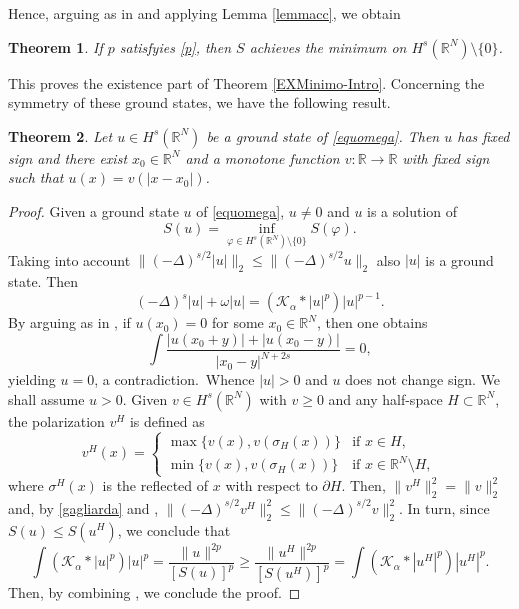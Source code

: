 \documentclass[10pt]{amsart}
\numberwithin{equation}{section}
\newtheorem{theorem}{Theorem}[section]
\begin{document}
\noindent
Hence, arguing as in  
 \cite[Proof of Proposition 2.2]{MV} 
and applying Lemma \ref{lemmacc}, we obtain
\begin{theorem}\label{ILTEOREMA}
If $p$ satisfyies \eqref{p}, then $S$ achieves the minimum on $H^{s}(\mathbb R^{N})\setminus\{0\}$.
\end{theorem}
\noindent This proves the existence part of Theorem \ref{EXMinimo-Intro}.
\noindent Concerning the symmetry of these ground states, we have the following result.
\begin{theorem}
\label{sym-gs-thm}
Let $u\in H^s({{\mathbb R}}^N)$ be a ground state of \eqref{equomega}. Then $u$ has fixed 
sign and there exist $x_0\in{{\mathbb R}}^N$ and a monotone function $v:{{\mathbb R}}\to{{\mathbb R}}$ 
with fixed sign such that  $u(x)=v(|x-x_0|)$.
\end{theorem}
\begin{proof}
Given a ground state $u$ of \eqref{equomega}, $u\neq 0$ and $u$ is a solution of 
$$
S(u)=\inf_{\varphi\in H^s({{\mathbb R}}^N)\setminus\{0\}}S(\varphi).
$$  
Taking into account   $\|(-\Delta)^{s/2}|u|\|_{2}\leq \|(-\Delta)^{s/2}u\|_{2}$
also $|u|$ is a ground state. Then
\begin{equation*} 
{{(-\Delta)^{s}}} |u| +\omega |u|={{(\mathcal K_{\alpha}*|u|^{p})}} |u|^{p-1}.
\end{equation*}
By arguing as in \cite[end of Section 3]{FQT}, if $u(x_0)=0$ for some $x_0\in{{\mathbb R}}^N$, then one obtains
$$
\int \frac{|u(x_0+y)|+|u(x_0-y)|}{|x_{0}-y|^{N+2s}}=0,
$$
yielding $u=0$, a contradiction.\ Whence $|u|>0$ and 
$u$ does not change sign. We shall assume $u>0$.
Given $v\in H^s({{\mathbb R}}^N)$ with $v\geq 0$ and any half-space $H\subset {{\mathbb R}}^N$, 
the polarization $v^H$ is defined as
$$
v^H(x)=
\begin{cases}
\max\{v(x),v(\sigma_H(x))\} & \text{if $x\in H$,} \\
\min\{v(x),v(\sigma_H(x))\} & \text{if $x\in {{\mathbb R}}^N\setminus H$}, 
\end{cases}
$$
where $\sigma^{H}(x)$ is the reflected of $x$ with respect to $\partial H$. Then, $\|v^H\|_2^2=\|v\|_2^2$ and, by \eqref{gagliarda} and \cite[Theorem 2]{B}, $\|(-\Delta)^{s/2} v^H\|_2^{2}
\leq 
\|(-\Delta)^{s/2} v\|_2^{2}$.
In turn, since $S(u)\leq S(u^H)$, we conclude that 
\[
\int ({\mathcal K}_\alpha *|u|^p) |u|^{p}
=\frac{\|u\|^{2p}}{[S(u)]^p}
\geq 
\frac{\|u^H\|^{2p}}{[S(u^H)]^p}
=\int ({\mathcal K}_\alpha *|u^H|^p ) |u^H|^{p}.
\]
Then, by combining \cite[Lemma 5.3 and Lemma 5.4]{MV}, we conclude the proof.
\end{proof}
\end{document}

